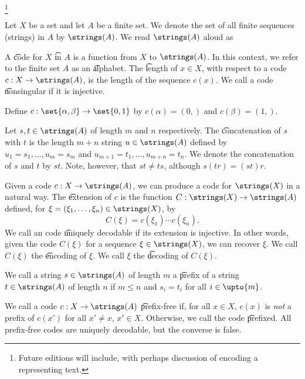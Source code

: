 
\footnote{Future editions will include, with perhaps discussion of encoding a representing text.}


Let $X$ be a set and let $A$ be a finite set.
We denote the set of all finite sequences (strings) in $A$ by $\strings(A)$.
We read $\strings(A)$ aloud as 

A \t{code} for $X$ \t{in} $A$ is a function from $X$ to $\strings(A)$.
In this context, we refer to the finite set $A$ as an \t{alphabet}.
The \t{length} of $x \in X$, with respect to a code $c: X \to \strings(A)$, is the length of the sequence $c(x)$.
We call a code \t{nonsingular} if it is injective.


Define $c: \set{\alpha, \beta} \to \set{0, 1}$ by $c(\alpha) = (0,)$ and $c(\beta) = (1,)$.



Let $s,t \in \strings(A)$ of length $m$  and $n$ respectively.
The \t{concatenation} of $s$ with $t$ is the length $m+n$ string $u \in \strings(A)$ defined by $u_{1} = s_1, \dots, u_m = s_m$ and $u_{m+1} = t_1, \dots, u_{m+n} = t_n$.
We denote the concatenation of $s$ and $t$ by $st$.
Note, however, that $st \neq ts$, although $s(tr) = (st)r$.

Given a code $c: X \to \strings(A)$, we can produce a code for $\strings(X)$ in a natural way.
The \t{extension} of $c$ is the function $C: \strings(X) \to \strings(A)$ defined, for $\xi = (\xi_1, \dots, \xi_n) \in \strings(X)$, by
\[
  C(\xi) = c(\xi_1) \cdots c(\xi_n).
\]
We call an code \t{uniquely decodable} if its extension is injective.
In other words, given the code $C(\xi)$ for a sequence $\xi \in \strings(X)$, we can recover $\xi$.
We call $C(\xi)$ the \t{encoding} of $\xi$.
We call $\xi$ the \t{decoding} of $C(\xi)$.


We call a string $s \in \strings(A)$ of length $m$ a \t{prefix} of a string $t \in \strings(A)$ of length $n$ if $m \leq n$ and $s_i = t_i$ for all $i \in \upto{m}$.

We call a code $c: X \to \strings(A)$ \t{prefix-free} if, for all $x \in X$, $c(x)$ is \textit{not} a prefix of $c(x')$ for all $x' \neq x$, $x' \in X$.
Otherwise, we call the code \t{prefixed}.
All prefix-free codes are uniquely decodable, but the converse is false.

